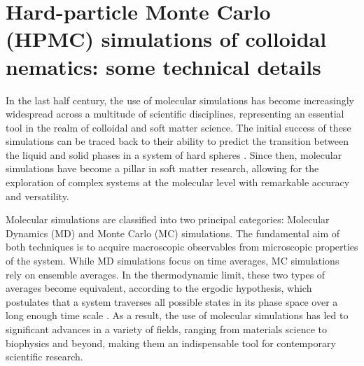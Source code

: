 \section[HPMC simulations of colloidal nematics]{Hard-particle Monte Carlo (HPMC) simulations of colloidal nematics: some technical details}

In the last half century, the use of molecular simulations has become increasingly widespread across a multitude of scientific disciplines, representing an essential tool in the realm of colloidal and soft matter science. The initial success of these simulations can be traced back to their ability to predict the transition between the liquid and solid phases in a system of hard spheres \cite{ALDER57,WOOD57}. Since then, molecular simulations have become a pillar in soft matter research, allowing for the exploration of complex systems at the molecular level with remarkable accuracy and versatility.

Molecular simulations are classified into two principal categories: Molecular Dynamics (MD) and Monte Carlo (MC) simulations. The fundamental aim of both techniques is to acquire macroscopic observables from microscopic properties of the system. While MD simulations focus on time averages, MC simulations rely on ensemble averages. In the thermodynamic limit, these two types of averages become equivalent, according to the ergodic hypothesis, which postulates that a system traverses all possible states in its phase space over a long enough time scale \cite{dfrenkel96:mc}. As a result, the use of molecular simulations has led to significant advances in a variety of fields, ranging from materials science to biophysics and beyond, making them an indispensable tool for contemporary scientific research.

